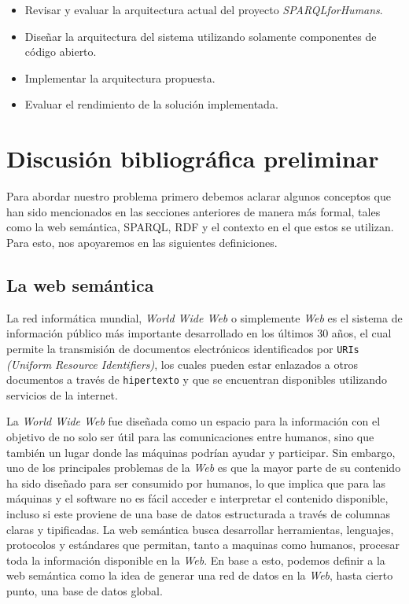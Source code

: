 \documentclass[conference,compsoc]{IEEEtran}
\begin{document}
\begin{itemize}
    \item Revisar y evaluar la arquitectura actual del proyecto
    \textit{SPARQLforHumans}.
    \item Diseñar la arquitectura del sistema utilizando solamente componentes
    de código abierto.
    \item Implementar la arquitectura propuesta.
    \item Evaluar el rendimiento de la solución implementada.
\end{itemize}

\section{Discusión bibliográfica preliminar}

Para abordar nuestro problema primero debemos aclarar algunos conceptos que han
sido mencionados en las secciones anteriores de manera más formal, tales como la
web semántica, SPARQL, RDF y el contexto en el que estos se utilizan. Para esto,
nos apoyaremos en las siguientes definiciones.

    \subsection{La web semántica}

La red informática mundial, \textit{World Wide Web} o simplemente \textit{Web}
es el sistema de información público más importante desarrollado en los últimos
30 años, el cual permite la transmisión de documentos electrónicos identificados
por \texttt{URIs} \textit{(Uniform Resource Identifiers)}, los cuales pueden
estar enlazados a otros documentos a través de \texttt{hipertexto} y que se
encuentran disponibles utilizando servicios de la internet.

La \textit{World Wide Web} fue diseñada como un espacio para la información con
el objetivo de no solo ser útil para las comunicaciones entre humanos, sino que
también un lugar donde las máquinas podrían ayudar y participar. Sin embargo,
uno de los principales problemas de la \textit{Web} es que la mayor parte de su
contenido ha sido diseñado para ser consumido por humanos, lo que implica que
para las máquinas y el software no es fácil acceder e interpretar el contenido
disponible, incluso si este proviene de una base de datos estructurada a través
de columnas claras y tipificadas. La web semántica busca desarrollar
herramientas, lenguajes, protocolos y estándares que permitan, tanto a maquinas
como humanos, procesar toda la información disponible en la \textit{Web}. En
base a esto, podemos definir a la web semántica como la idea de generar una red
de datos en la \textit{Web}, hasta cierto punto, una base de datos global.
\cite{berners1998semantic}
\end{document}
